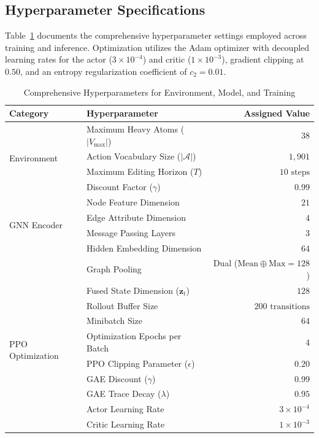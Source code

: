\documentclass{ieeeaccess}
\begin{document}
\subsection{Hyperparameter Specifications}
Table~\ref{tab:hyperparameters} documents the comprehensive hyperparameter settings employed across training and inference. Optimization utilizes the Adam optimizer with decoupled learning rates for the actor ($3 \times 10^{-4}$) and critic ($1 \times 10^{-3}$), gradient clipping at $0.50$, and an entropy regularization coefficient of $c_2 = 0.01$.

\begin{table}[!tbp]
\caption{Comprehensive Hyperparameters for Environment, Model, and Training}
\label{tab:hyperparameters}
\centering
\footnotesize
\begin{tabularx}{\columnwidth}{l l r}
\toprule
\textbf{Category} & \textbf{Hyperparameter} & \textbf{Assigned Value}\\
\midrule
\multirow{4}{*}{Environment} & Maximum Heavy Atoms ($|V_{\max}|$) & $38$\\
 & Action Vocabulary Size ($|\mathcal{A}|$) & $1,901$\\
 & Maximum Editing Horizon ($T$) & $10\text{ steps}$\\
 & Discount Factor ($\gamma$) & $0.99$\\
\midrule
\multirow{4}{*}{GNN Encoder} & Node Feature Dimension & $21$\\
 & Edge Attribute Dimension & $4$\\
 & Message Passing Layers & $3$\\
 & Hidden Embedding Dimension & $64$\\
 & Graph Pooling & Dual ($\text{Mean} \oplus \text{Max} = 128$)\\
 & Fused State Dimension ($\mathbf{z}_t$) & $128$\\
\midrule
\multirow{6}{*}{PPO Optimization} & Rollout Buffer Size & $200\text{ transitions}$\\
 & Minibatch Size & $64$\\
 & Optimization Epochs per Batch & $4$\\
 & PPO Clipping Parameter ($\epsilon$) & $0.20$\\
 & GAE Discount ($\gamma$) & $0.99$\\
 & GAE Trace Decay ($\lambda$) & $0.95$\\
 & Actor Learning Rate & $3 \times 10^{-4}$\\
 & Critic Learning Rate & $1 \times 10^{-3}$\\

\end{tabularx}
\end{table}
\end{document}
